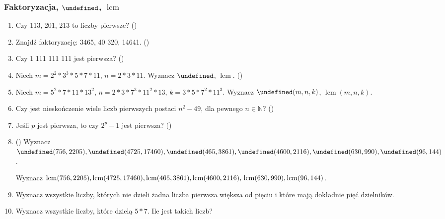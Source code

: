 \documentclass[12pt]{article}
\let\gcd\undefined
\DeclareMathOperator{\gcd}{gcd}
\DeclareMathOperator{\lcm}{lcm}
\newcommand{\NN}{\mathbb{N}}
\begin{document}
\subsubsection{Faktoryzacja, $\gcd$, $\lcm$}
\begin{enumerate}
	\item Czy 113, 201, 213 to liczby pierwsze? 
	(\cite[4.6.3, zad. 2]{Forman.2015})
	\item Znajdź faktoryzację: 3465, 40 320, 14641.  (\cite{Forman.2015})	
	\item  Czy 1 111 111 111 jest pierwsza? (\cite{Forman.2015})
	\item Niech $m = 2^2*3^3 * 5 * 7* 11$,  $n = 2*3*11$.
	Wyznacz $\gcd$, $\lcm$. (\cite{Forman.2015})
	\item Niech $m = 5^2*7*11*13^2$, $n = 2*3*7^3*11^2*13$,
	$k=3*5*7^2*11^3$.
	Wyznacz $\gcd(m,n,k)$, $\lcm(m,n,k)$. 
	\item 
	Czy jest nieskończenie wiele liczb pierwszych postaci $n^2 - 49$,
	dla pewnego $n\in\NN$? (\cite{Forman.2015})
	\item 
	Jeśli $p$ jest pierwsza, to czy $2^p - 1$ jest pierwsza? (\cite{Forman.2015})
	\item  (\cite{Forman.2015})
	Wyznacz
	$\gcd(756, 2205),
	\gcd(4725, 17460), 
	\gcd(465, 3861),
	\gcd(4600, 2116), \\
	\gcd(630, 990), 
	\gcd(96, 144)$.
	
	Wyznacz
	$\lcm(756, 2205),
	\lcm(4725, 17460),
	\lcm(465, 3861),
	\lcm(4600, 2116),\\
	\lcm(630, 990),
	\lcm(96, 144)$.
	
	
	\item Wyznacz wszystkie liczby, których nie dzieli
	żadna liczba pierwsza większa od pięciu i które mają 
	dokładnie pięć dzielników.
	
	\item Wyznacz wszystkie liczby, które dzielą $5*7$. 
	Ile jest takich liczb?
	
	
\end{enumerate}
\end{document}
